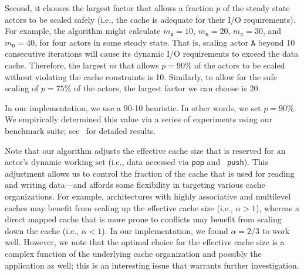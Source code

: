 \documentclass{sigplanconf}
\begin{document}
Second, it chooses the largest
factor that allows a fraction $p$ of the steady state actors to be
scaled safely (i.e., the cache is adequate for their I/O
requirements).  For example, the algorithm might calculate
$m_\texttt{A} = 10$,
$m_\texttt{B} = 20$, 
$m_\texttt{C} = 30$, and 
$m_\texttt{D} = 40$, for four actors in some steady state. That is,
scaling actor \texttt{A} beyond 10 consecutive iterations will cause
its dynamic I/O requirements to exceed the data cache. Therefore, the
largest $m$ that allows $p=90\%$ of the actors to be
scaled without violating the cache constraints is 10.
Similarly, to allow for the safe scaling of $p=75\%$ of the actors, the
largest factor we can choose is 20.

In our implementation, we use a 90-10 heuristic. In other words, we
set $p=90\%$. We empirically determined this value via a series of
experiments using our benchmark suite; see~\cite{janis-thesis} for
detailed results.

Note that our algorithm adjusts the effective cache size that is
reserved for an actor's 
dynamic working set (i.e., data accessed via {\tt pop} and {\tt
push}). This adjustment allows us to control the fraction of the cache
that is used for reading and writing data---and affords some
flexibility in targeting various cache organizations.  For example,
architectures with highly associative and multilevel caches may benefit
from scaling up the effective cache size (i.e., $\alpha > 1$), whereas
a direct mapped cache that is more prone to conflicts may benefit from
scaling down the cache (i.e., $\alpha < 1$). In our implementation, we
found $\alpha=2/3$ to work well. However, we note that the optimal
choice for the effective cache size is a complex function of the 
underlying cache organization and possibly the application as well; 
this is an interesting issue that warrants further investigation.
\end{document}
